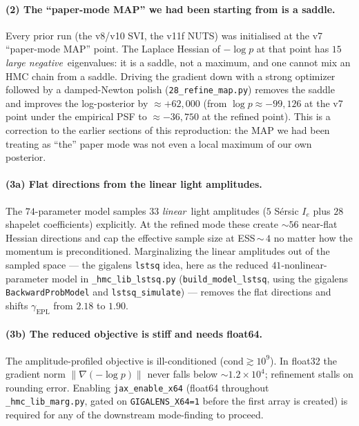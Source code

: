 \documentclass[11pt,letterpaper]{article}
\newcommand{\gammaEPL}{\ensuremath{\gamma_{\mathrm{EPL}}}}
\begin{document}
\paragraph{(2) The ``paper-mode MAP'' we had been starting from is a
saddle.} Every prior run (the v8/v10 SVI, the v11f NUTS) was
initialised at the v7 ``paper-mode MAP'' point. The Laplace Hessian of
$-\log p$ at that point has $15$ {\it large negative}\ eigenvalues: it
is a saddle, not a maximum, and one cannot mix an HMC chain from a
saddle. Driving the gradient down with a strong optimizer followed by a
damped-Newton polish (\texttt{28\_refine\_map.py}) removes the saddle and
improves the log-posterior by $\approx +62{,}000$ (from
$\log p\approx-99{,}126$ at the v7 point under the empirical PSF to
$\approx-36{,}750$ at the refined point). This is a correction to the
earlier sections of this reproduction: the MAP we had been treating as
``the'' paper mode was not even a local maximum of our own posterior.

\paragraph{(3a) Flat directions from the linear light amplitudes.} The
$74$-parameter model samples $33$ {\it linear}\ light amplitudes ($5$
S\'{e}rsic $I_{e}$ plus $28$ shapelet coefficients) explicitly. At the
refined mode these create $\sim 56$ near-flat Hessian directions and cap
the effective sample size at ESS\,$\sim$\,$4$ no matter how the momentum
is preconditioned. Marginalizing the linear amplitudes out of the sampled
space --- the gigalens \texttt{lstsq} idea, here as the reduced
$41$-nonlinear-parameter model in \texttt{\_hmc\_lib\_lstsq.py}
(\texttt{build\_model\_lstsq}, using the gigalens \texttt{BackwardProbModel}
and \texttt{lstsq\_simulate}) --- removes the flat directions and shifts
$\gammaEPL$ from $2.18$ to $1.90$.

\paragraph{(3b) The reduced objective is stiff and needs float64.} The
amplitude-profiled objective is ill-conditioned ($\mathrm{cond}\gtrsim
10^{9}$). In float32 the gradient norm $\|\nabla(-\log p)\|$ never falls
below $\sim 1.2\times10^{4}$; refinement stalls on rounding error.
Enabling \texttt{jax\_enable\_x64} (float64 throughout
\texttt{\_hmc\_lib\_marg.py}, gated on \texttt{GIGALENS\_X64=1} before the
first array is created) is required for any of the downstream
mode-finding to proceed.
\end{document}
